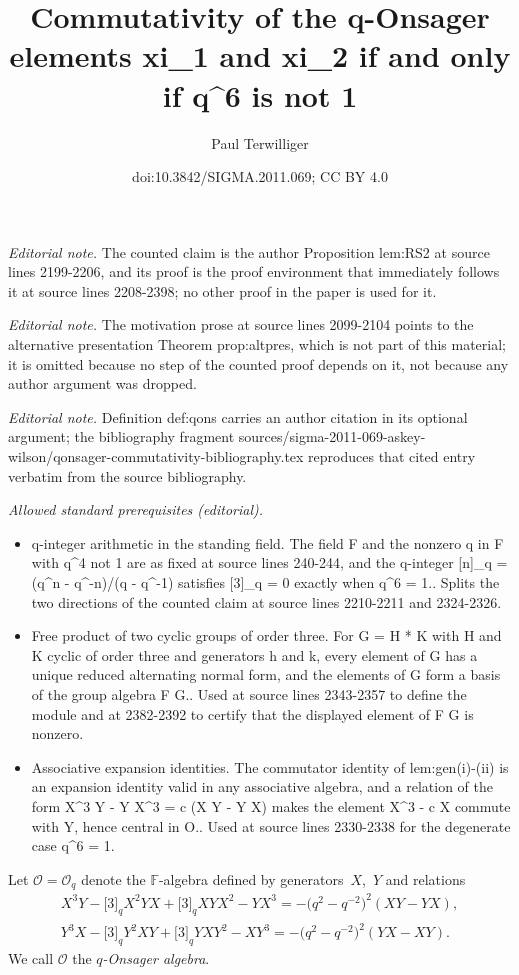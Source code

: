 \documentclass[10pt,a4paper]{amsart}
\title{Commutativity of the q-Onsager elements xi\_1 and xi\_2 if and only if q\textasciicircum{}6 is not 1}
\author{Paul Terwilliger}
\date{doi:10.3842/SIGMA.2011.069; CC BY 4.0}
\numberwithin{equation}{section}
\begin{document}
\maketitle
\noindent\textit{Editorial note.} The counted claim is the author Proposition lem:RS2 at source lines 2199-2206, and its proof is the proof environment that immediately follows it at source lines 2208-2398; no other proof in the paper is used for it.\par\medskip
\noindent\textit{Editorial note.} The motivation prose at source lines 2099-2104 points to the alternative presentation Theorem prop:altpres, which is not part of this material; it is omitted because no step of the counted proof depends on it, not because any author argument was dropped.\par\medskip
\noindent\textit{Editorial note.} Definition def:qons carries an author citation in its optional argument; the bibliography fragment sources/sigma-2011-069-askey-wilson/qonsager-commutativity-bibliography.tex reproduces that cited entry verbatim from the source bibliography.\par\medskip
\noindent\textit{Allowed standard prerequisites (editorial).}\begin{itemize}
\item q-integer arithmetic in the standing field. The field F and the nonzero q in F with q\textasciicircum{}4 not 1 are as fixed at source lines 240-244, and the q-integer [n]\_q = (q\textasciicircum{}n - q\textasciicircum{}-n)/(q - q\textasciicircum{}-1) satisfies [3]\_q = 0 exactly when q\textasciicircum{}6 = 1.. Splits the two directions of the counted claim at source lines 2210-2211 and 2324-2326.
\item Free product of two cyclic groups of order three. For G = H * K with H and K cyclic of order three and generators h and k, every element of G has a unique reduced alternating normal form, and the elements of G form a basis of the group algebra F G.. Used at source lines 2343-2357 to define the module and at 2382-2392 to certify that the displayed element of F G is nonzero.
\item Associative expansion identities. The commutator identity of lem:gen(i)-(ii) is an expansion identity valid in any associative algebra, and a relation of the form X\textasciicircum{}3 Y - Y X\textasciicircum{}3 = c (X Y - Y X) makes the element X\textasciicircum{}3 - c X commute with Y, hence central in O.. Used at source lines 2330-2338 for the degenerate case q\textasciicircum{}6 = 1.
\end{itemize}\medskip
\begin{Definition}
\label{def:qons}
Let ${\mathcal O}={\mathcal O}_q$ denote the
 $\mathbb F$-algebra
 def\/ined by genera\-tors~$X$,~$Y$ and relations
 \begin{gather}
X^3Y-\lbrack 3\rbrack_q X^2YX+\lbrack 3\rbrack_q XYX^2-YX^3
= -\big(q^2-q^{-2}\big)^2(XY-YX),
\label{eq:td1}
\\
Y^3X-\lbrack 3\rbrack_q Y^2XY+\lbrack 3\rbrack_q YXY^2-XY^3
= -\big(q^2-q^{-2}\big)^2(YX-XY).
\label{eq:td2}
 \end{gather}
We call $\mathcal O$ the {\it $q$-Onsager algebra}.
\end{Definition}
\end{document}
